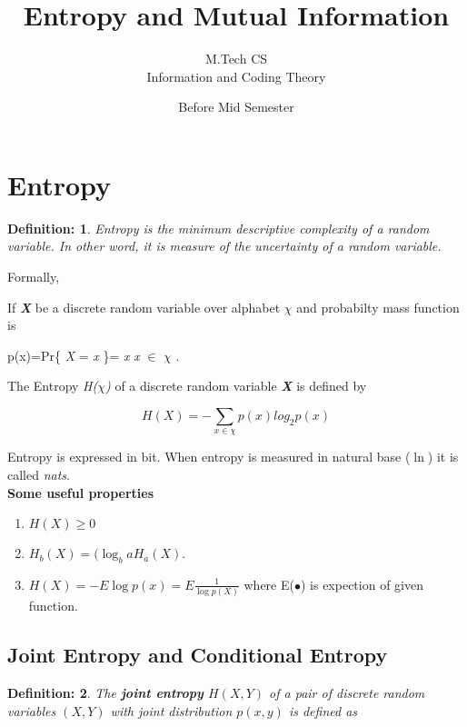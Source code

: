 \documentclass[11pt]{article}
\newtheorem{defn}{Definition:}
\begin{document}
\title{Entropy and Mutual Information}
\author{M.Tech CS\\
 Information and Coding Theory}
\date {Before Mid Semester}
\maketitle
\section{Entropy}
\begin{defn}
Entropy is the minimum descriptive complexity of a random variable. In other word, it is measure of the uncertainty of a random variable.
\end{defn}
Formally,

If \textbf{ \textit{X}} be a discrete random variable over alphabet $\chi$ and probabilty mass function is
 
p(x)=Pr\{ {\textit{X} = \textit{x} \}= \textit{x}} \textit{x} $\in$ \textbf{\textit{$\chi$} }.

The Entropy \textit{H($\chi$)} of a discrete random variable \textbf{ \textit{X}} is defined by 

\begin{equation}
H(X) = - \sum \limits_{x \in \chi} p(x) log_{2} p(x)
\end{equation}


Entropy is expressed in bit. 
When entropy is measured in natural base ($\ln$) it is called \textit{nats}.\\
\textbf{Some useful properties}
\begin{enumerate}
	

\item $H(X) \geq 0$
\item $H_{b}(X)=(\log_{b} a H_{a} (X).$
\item $H(X)=-E\log p(x) = E \frac{1}{\log p(X)}$ where E($\bullet$) is expection of given function.

\end{enumerate}

\subsection{Joint Entropy and Conditional Entropy}

\begin{defn}
The \textbf{joint entropy } $H(X,Y)$ of a pair of discrete random variables $(X,Y)$ with joint distribution $p(x,y)$ is defined as 
\end{defn}
\end{document}
